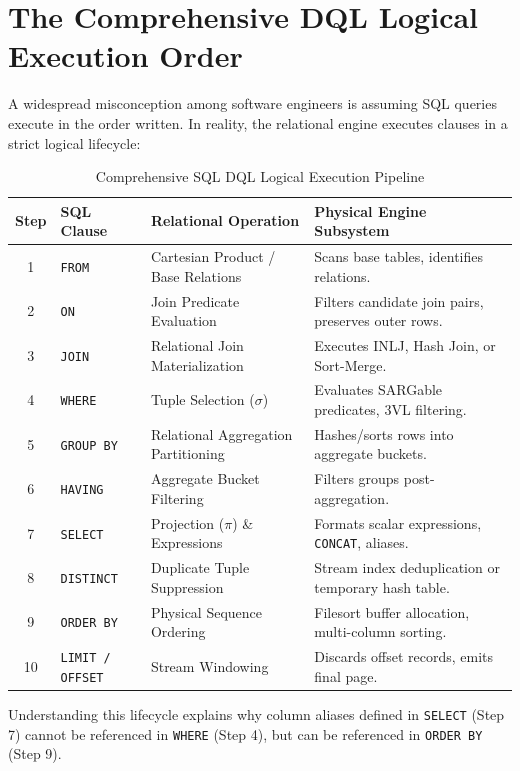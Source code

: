 \documentclass[10pt,twocolumn,letterpaper]{article}
\begin{document}
\section{The Comprehensive DQL Logical Execution Order}
\label{sec:execution_order}

A widespread misconception among software engineers is assuming SQL queries execute in the order written. In reality, the relational engine executes clauses in a strict logical lifecycle:

\begin{table}[htbp]
\caption{Comprehensive SQL DQL Logical Execution Pipeline}
\label{tab:execution_pipeline}
\centering
\scriptsize
\begin{tabular}{clll}
\toprule
\textbf{Step} & \textbf{SQL Clause} & \textbf{Relational Operation} & \textbf{Physical Engine Subsystem} \\
\midrule
1 & \texttt{FROM} & Cartesian Product / Base Relations & Scans base tables, identifies relations. \\
2 & \texttt{ON} & Join Predicate Evaluation & Filters candidate join pairs, preserves outer rows. \\
3 & \texttt{JOIN} & Relational Join Materialization & Executes INLJ, Hash Join, or Sort-Merge. \\
4 & \texttt{WHERE} & Tuple Selection ($\sigma$) & Evaluates SARGable predicates, 3VL filtering. \\
5 & \texttt{GROUP BY} & Relational Aggregation Partitioning & Hashes/sorts rows into aggregate buckets. \\
6 & \texttt{HAVING} & Aggregate Bucket Filtering & Filters groups post-aggregation. \\
7 & \texttt{SELECT} & Projection ($\pi$) \& Expressions & Formats scalar expressions, \texttt{CONCAT}, aliases. \\
8 & \texttt{DISTINCT} & Duplicate Tuple Suppression & Stream index deduplication or temporary hash table. \\
9 & \texttt{ORDER BY} & Physical Sequence Ordering & Filesort buffer allocation, multi-column sorting. \\
10 & \texttt{LIMIT / OFFSET} & Stream Windowing & Discards offset records, emits final page. \\
\bottomrule
\end{tabular}
\end{table}

Understanding this lifecycle explains why column aliases defined in \texttt{SELECT} (Step 7) cannot be referenced in \texttt{WHERE} (Step 4), but can be referenced in \texttt{ORDER BY} (Step 9).
\end{document}

